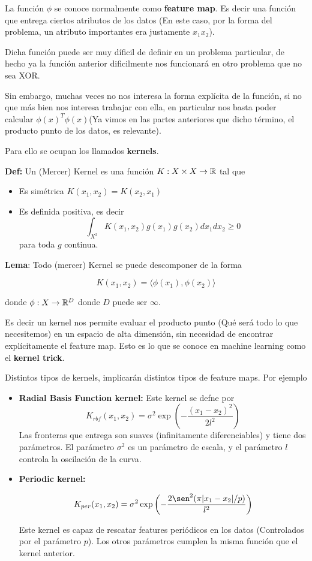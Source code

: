 
La función $\phi$ se conoce normalmente como \textbf{feature map}. Es decir una función que entrega ciertos atributos de los datos (En este caso, por la forma del problema, un atributo importantes era justamente $x_1x_2$).

Dicha función puede ser muy díficil de definir en un problema particular, de hecho ya la función anterior dificilmente nos funcionará en otro problema que no sea XOR. 

Sin embargo, muchas veces no nos interesa la forma explícita de la función, si no que más bien nos interesa trabajar con ella, en particular nos basta poder calcular $\phi(x)^{T} \phi(x)$(Ya vimos en las partes anteriores que dicho término, el producto punto de los datos, es relevante). 

Para ello se ocupan los llamados \textbf{kernels}.

\textbf{Def:} Un (Mercer) Kernel es una función $K: X\times X \to {\mathbb R}$ tal que
\begin{itemize}
    \item Es simétrica $K(x_1 , x_2 ) = K (x_2 , x_1)$
    \item Es definida positiva, es decir
    $$\int_{X^2} K(x_1, x_2)g(x_1) g(x_2) dx_1 dx_2\geq 0$$
    para toda $g$ continua. 
\end{itemize}

\textbf{Lema}: Todo (mercer) Kernel se puede descomponer de la forma

$$K(x_1, x_2) = \langle \phi(x_1) , \phi(x_2) \rangle$$

donde $\phi: X \to {\mathbb R}^D$ donde $D$ puede ser $\infty$.

Es decir un kernel nos permite evaluar el producto punto (Qué será todo lo que necesitemos) en un espacio de alta dimensión, sin necesidad de encontrar explícitamente el feature map. Esto es lo que se conoce en machine learning como el \textbf{kernel trick}.

Distintos tipos de kernels, implicarán distintos tipos de feature maps. Por ejemplo 
\begin{itemize}
    \item \textbf{Radial Basis Function kernel:} Este kernel se defne por
    $$K_{rbf} (x_1 , x_2 ) = \sigma^2 \exp\left(-\frac{(x_1 -x_2)^2}{2l^2}\right)$$
    Las fronteras que entrega son suaves (infinitamente diferenciables) y tiene dos parámetros. El parámetro $\sigma^2$ es un parámetro de escala, y el parámetro $l$ controla la oscilación de la curva. 
    
    \item \textbf{Periodic kernel:}
    
    $$K_{per} (x_1 , x_2) = \sigma^2 \exp\left(- \frac{2\sen^2 (\pi|x_1 -x_2|/p)}{l^2}\right)$$
    
    Este kernel es capaz de rescatar features periódicos en los datos (Controlados por el parámetro $p$). Los otros parámetros cumplen la misma función que el kernel anterior. 
    
\end{itemize}

